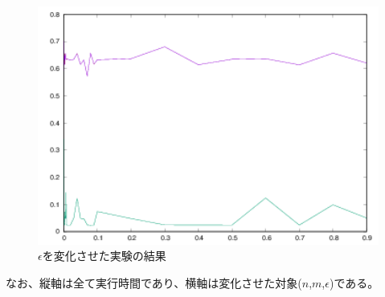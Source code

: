 \begin{figure}
  \centering
  \includegraphics[width=14cm]{epsilon.png}
  \caption{$\epsilon$を変化させた実験の結果}
  \label{test4-epsilon}
\end{figure}
なお、縦軸は全て実行時間であり、横軸は変化させた対象($n$,$m$,$\epsilon$)である。

